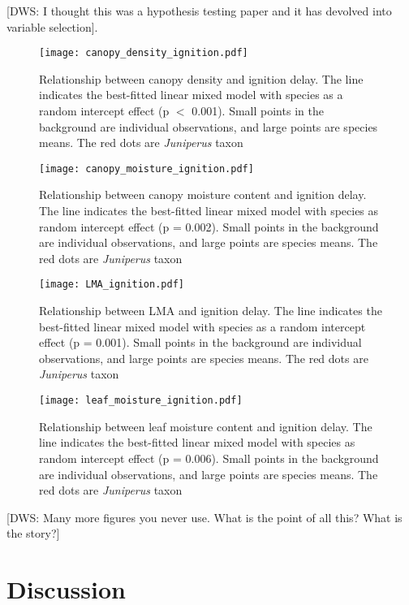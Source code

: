 \documentclass[12pt]{report}
\begin{document}
[DWS: I thought this was a hypothesis testing paper and it has devolved into variable selection].



\begin{figure}
    \centering
    \texttt{[image: canopy\_density\_ignition.pdf]}
    \caption{Relationship between canopy density and ignition delay. The line indicates the best-fitted linear mixed model with species as a random intercept effect (p $<$ 0.001). Small points in the background are individual observations, and large points are species means. The red dots are \emph{Juniperus} taxon}
\end{figure}

\begin{figure}
    \centering
    \texttt{[image: canopy\_moisture\_ignition.pdf]}
    \caption{Relationship between canopy moisture content and ignition delay. The line indicates the best-fitted linear mixed model with species as random intercept effect (p = 0.002). Small points in the background are individual observations, and large points are species means. The red dots are \emph{Juniperus} taxon}
\end{figure}

\begin{figure}
    \centering
    \texttt{[image: LMA\_ignition.pdf]}
    \caption{Relationship between LMA and ignition delay. The line indicates the best-fitted linear mixed model with species as a random intercept effect (p = 0.001). Small points in the background are individual observations, and large points are species means. The red dots are \emph{Juniperus} taxon}
\end{figure}



\begin{figure}
    \centering
    \texttt{[image: leaf\_moisture\_ignition.pdf]}
    \caption{Relationship between leaf moisture content and ignition delay. The line indicates the best-fitted linear mixed model with species as random intercept effect (p = 0.006). Small points in the background are individual observations, and large points are species means.  The red dots are \emph{Juniperus} taxon}

\end{figure}


[DWS: Many more figures you never use. What is the point of all this? What is the story?]


\section{Discussion}
\end{document}
